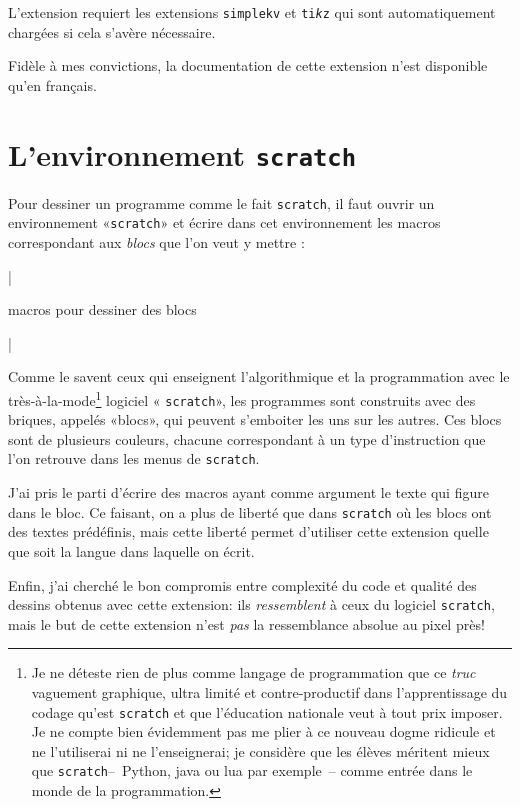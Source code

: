 \documentclass[french,a4paper,10pt]{article}
\makeatletter
\def\SCRATCH{\texttt{scratch}\xspace}
\def\SSCRATCH{\texttt{\scrname}\xspace}
\def\code{\expandafter\code@i\string}
\def\code@i#1{%
	\begingroup
		\par\nobreak\medskip\parindent0pt
		\leftskip.1\linewidth
		\catcode`\^^I 13 \begingroup\lccode`\~`\^^I \lowercase{\endgroup\def~{\leavevmode\space\space\space\space}}%
		\let\do\@makeother \dospecials
		\ttfamily\small\@noligs
		\make@car@active\<{$\langle$\begingroup\itshape}%
		\make@car@active\>{\endgroup$\rangle$}%
		\obeylines\obeyspaces
		\def\code@ii##1#1{##1\par\medbreak\endgroup}%
		\code@ii
}
\newcommand\make@car@active[1]{%
	\catcode`#1\active
	\begingroup
		\lccode`\~`#1\relax
		\lowercase{\endgroup\def~}%
}
\makeatother
\begin{document}
L'extension \SSCRATCH requiert les extensions \texttt{simplekv} et \texttt{ti\textit kz} qui sont automatiquement chargées si cela s'avère nécessaire.\medbreak

Fidèle à mes convictions, la documentation de cette extension n'est disponible qu'en français.

\section{L'environnement \SCRATCH}
Pour dessiner un programme comme le fait \SCRATCH, il faut ouvrir un environnement «\SCRATCH» et écrire dans cet environnement les macros correspondant aux \emph{blocs} que l'on veut y mettre :

\code|\begin{scratch}
	macros pour dessiner des blocs
\end{scratch}|

Comme le savent ceux qui enseignent l'algorithmique et la programmation avec le très-à-la-mode\footnote{Je ne déteste rien de plus comme langage de programmation que ce \emph{truc} vaguement graphique, ultra limité et contre-productif dans l'apprentissage du codage qu'est \SCRATCH et que l'éducation nationale veut à tout prix imposer. Je ne compte bien évidemment pas me plier à ce nouveau dogme ridicule et ne l'utiliserai ni ne l'enseignerai; je considère que les élèves méritent mieux que \SCRATCH --~Python, java ou lua par exemple~-- comme entrée dans le monde de la programmation.} logiciel « \SCRATCH », les programmes sont construits avec des briques, appelés «blocs», qui peuvent s'emboiter les uns sur les autres. Ces blocs sont de plusieurs couleurs, chacune correspondant à un type d'instruction que l'on retrouve dans les menus de \SCRATCH.

J'ai pris le parti d'écrire des macros ayant comme argument le texte qui figure dans le bloc. Ce faisant, on a plus de liberté que dans \SCRATCH où les blocs ont des textes prédéfinis, mais cette liberté permet d'utiliser cette extension quelle que soit la langue dans laquelle on écrit.

Enfin, j'ai cherché le bon compromis entre complexité du code et qualité des dessins obtenus avec cette extension: ils \emph{ressemblent} à ceux du logiciel \SCRATCH, mais le but de cette extension n'est \emph{pas} la ressemblance absolue au pixel près!
\end{document}
